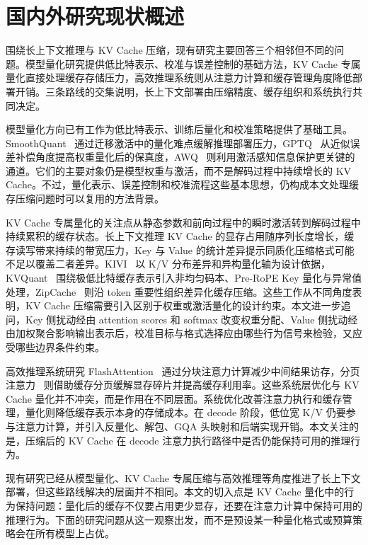\section{国内外研究现状概述}

围绕长上下文推理与 KV Cache 压缩，现有研究主要回答三个相邻但不同的问题。模型量化研究提供低比特表示、校准与误差控制的基础方法，KV Cache 专属量化直接处理缓存存储压力，高效推理系统则从注意力计算和缓存管理角度降低部署开销。三条路线的交集说明，长上下文部署由压缩精度、缓存组织和系统执行共同决定。

模型量化方向已有工作为低比特表示、训练后量化和校准策略提供了基础工具。SmoothQuant~\cite{xiao2023smoothquant} 通过迁移激活中的量化难点缓解推理部署压力，GPTQ~\cite{frantar2023gptq} 从近似误差补偿角度提高权重量化后的保真度，AWQ~\cite{lin2024awq} 则利用激活感知信息保护更关键的通道。它们的主要对象仍是模型权重与激活，而不是解码过程中持续增长的 KV Cache。不过，量化表示、误差控制和校准流程这些基本思想，仍构成本文处理缓存压缩问题时可以复用的方法背景。

KV Cache 专属量化的关注点从静态参数和前向过程中的瞬时激活转到解码过程中持续累积的缓存状态。长上下文推理 KV Cache 的显存占用随序列长度增长，缓存读写带来持续的带宽压力，Key 与 Value 的统计差异提示同质化压缩格式可能不足以覆盖二者差异。KIVI~\cite{liu2024kivi} 以 K/V 分布差异和异构量化轴为设计依据，KVQuant~\cite{hooper2024kvquant} 围绕极低比特缓存表示引入非均匀码本、Pre-RoPE Key 量化与异常值处理，ZipCache~\cite{he2024zipcache} 则沿 token 重要性组织差异化缓存压缩。这些工作从不同角度表明，KV Cache 压缩需要引入区别于权重或激活量化的设计约束。本文进一步追问，Key 侧扰动经由 attention scores 和 softmax 改变权重分配、Value 侧扰动经由加权聚合影响输出表示后，校准目标与格式选择应由哪些行为信号来检验，又应受哪些边界条件约束。

高效推理系统研究 FlashAttention~\cite{dao2022flashattention,dao2024flashattention2} 通过分块注意力计算减少中间结果访存，分页注意力~\cite{kwon2023vllm} 则借助缓存分页缓解显存碎片并提高缓存利用率。这些系统层优化与 KV Cache 量化并不冲突，而是作用在不同层面。系统优化改善注意力执行和缓存管理，量化则降低缓存表示本身的存储成本。在 decode 阶段，低位宽 K/V 仍要参与注意力计算，并引入反量化、解包、GQA 头映射和后端实现开销。本文关注的是，压缩后的 KV Cache 在 decode 注意力执行路径中是否仍能保持可用的推理行为。

现有研究已经从模型量化、KV Cache 专属压缩与高效推理等角度推进了长上下文部署，但这些路线解决的层面并不相同。本文的切入点是 KV Cache 量化中的行为保持问题：量化后的缓存不仅要占用更少显存，还要在注意力计算中保持可用的推理行为。下面的研究问题从这一观察出发，而不是预设某一种量化格式或预算策略会在所有模型上占优。

